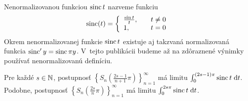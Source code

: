 \begin{definicia}
    Nenormalizovanou funkciou $\operatorname{sinc} t$ nazveme funkciu
    \begin{equation*}
        \operatorname{sinc}(t) = \left\{
            \begin{array}{l l}
                \frac{\sin t}{t}, \quad& t\not=0\\
                1,\quad&t=0
            \end{array}
            \right.
    \end{equation*}
    Okrem nenormalizovanej funkcie $\operatorname{sinc} t$ existuje aj takzvaná
    normalizovaná funkcia $\operatorname{sinc}' y = \operatorname{sinc} \pi y$. V~tejto publikácii
    budeme až na zdôraznené výnimky používať nenormalizovanú definíciu.
\end{definicia}

\begin{veta}
Pre každé $s\in\mathbb{N}$, postupnosť
$\left\{S_n\left( \frac{2s-1}{n+1}\pi\right)\right\}_{n=1}^{\infty}$
má limitu $\int_0^{(2s-1)\pi} \operatorname{sinc} t \; \mathrm{d} t$. Podobne, postupnosť
$\left\{S_n\left( \frac{2s}{n}\pi\right)\right\}_{n=1}^{\infty}$
má limitu $\int_0^{2s\pi} \operatorname{sinc} t \; \mathrm{d} t$.
\end{veta}

